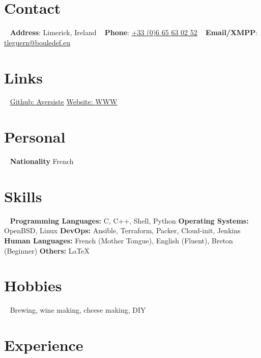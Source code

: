 \documentclass[]{friggeri-cv} %
\begin{document}


\begin{aside} %
\section{Contact}
~
\textbf{Address}: Limerick, Ireland
~
\textbf{Phone}: \href{tel:0033665630252}{\underline{+33 (0)6 65 63 02 52}}
~
\textbf{Email/XMPP}: \href{mailto:tleguern@bouledef.eu}{\underline{tleguern@bouledef.eu}}
\section {Links}
~
\href{https://github.com/Aversiste}{Github: \underline{Aversiste}}
\href{https://www.bouledef.eu/~tleguern}{Website: \underline{WWW}}
\section{Personal}
~
\textbf{Nationality}
French
\section{Skills}
~
\textbf{Programming Languages:} C, C++, Shell, Python
\textbf{Operating Systems:} OpenBSD, Linux
\textbf{DevOps:} Ansible, Terraform, Packer, Cloud-init, Jenkins
\textbf{Human Languages:} French (Mother Tongue), English (Fluent), Breton (Beginner)
\textbf{Others:} \LaTeX
\section{Hobbies}
~
Brewing, wine making, cheese making, DIY
\end{aside}


\section{Experience}
\end{document}
